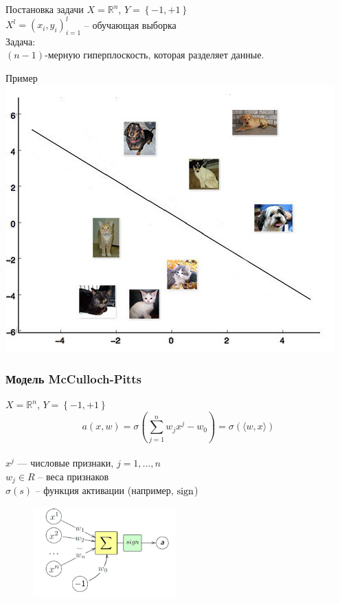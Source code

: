 \documentclass[10pt]{beamer}
\begin{document}
\begin{frame}{Постановка задачи}
  $X = \mathbb{R}^n$, ${Y = \left\{ -1, + 1\right\}}$\\
  ${X^l = (x_i, y_i)_{i = 1}^l}$ -- обучающая выборка\\
  \bigbreak
  \alert{Задача}:\\
  $(n-1)$-мерную гиперплоскость, которая разделяет данные.
\end{frame}

\begin{frame}{Пример}
  \centering
  \includegraphics[width=0.9 \textwidth, keepaspectratio]{images/catdog1}
\end{frame}

\begin{frame}\frametitle{Модель McCulloch-Pitts}
  $X = \mathbb{R}^n$, ${Y = \left\{ -1, + 1\right\}}$\\
	\pause
	$$a(x,w) = \sigma(\sum\limits_{j=1}^n w_j x^j - w_0) = \sigma(\langle w, x \rangle)$$\\
  $x^j$ — числовые признаки, $j = 1,\dots, n$ \\	
	$w_j \in R$ -- веса признаков\\
	$\sigma(s)$ -- функция активации (например, $\operatorname{sign}$)
	\pause
	\begin{figure}[htbp]
	  \includegraphics[height=100pt, keepaspectratio = true]{images/neuron-scheme}   
	\end{figure}
\end{frame}
\end{document}
